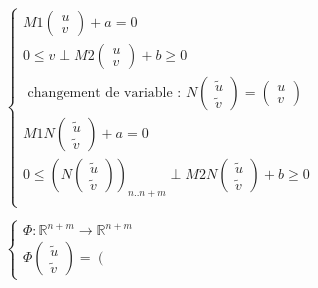 \frame
{

\begin{equation}
  \begin{array}{c}
   \begin{cases}
    M1 \left(\begin{array}{c} u\\ v\end{array}\right)  + a =0 \\
    {0} \le {v} \perp     M2\left(\begin{array}{c} u\\ v\end{array}\right) +b   \ge {0}\\
    \textrm{ changement de variable : }
    N \left(\begin{array}{c} \tilde{u}\\ \tilde{v}\end{array}\right)=  \left(\begin{array}{c} u\\ v\end{array}\right)\\
    M1N \left(\begin{array}{c} \tilde{u}\\ \tilde{v}\end{array}\right)  + a =0 \\
    {0} \le {\left(N \left(\begin{array}{c} \tilde{u}\\ \tilde{v}\end{array}\right)\right)_{n..n+m}} \perp     M2N\left(\begin{array}{c} \tilde{u}\\ \tilde{v}\end{array}\right) +b   \ge {0}\\
    
    \end{cases}\\\\
   \begin{cases}
   \Phi :\mathbb{R}^{n+m} \longrightarrow \mathbb{R}^{n+m}\\
   \Phi \left(\begin{array}{c} \tilde{u}\\ \tilde{v}\end{array}\right)=\left(\begin{array}{c}
  

\end{array}
\end{cases}
\end{array}
\end{equation}}
